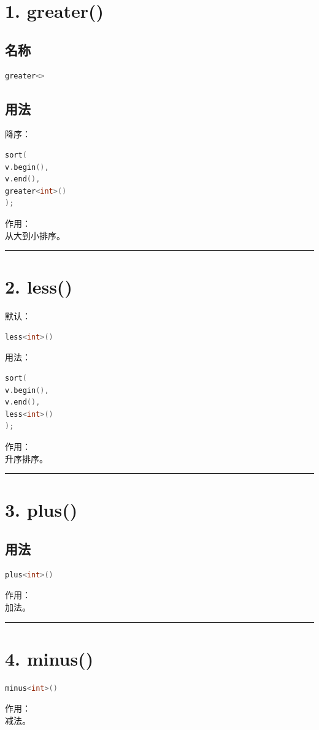 \documentclass[9pt,twocolumn]{extarticle}
\begin{document}
\section{1. greater()}

\subsection{名称}
\begin{lstlisting}[language=C++]
greater<>
\end{lstlisting}

\subsection{用法}
降序：
\begin{lstlisting}[language=C++]
sort(
v.begin(),
v.end(),
greater<int>()
);
\end{lstlisting}
作用：\\
从大到小排序。

\noindent\rule{\linewidth}{0.4pt}

\section{2. less()}

默认：
\begin{lstlisting}[language=C++]
less<int>()
\end{lstlisting}
用法：
\begin{lstlisting}[language=C++]
sort(
v.begin(),
v.end(),
less<int>()
);
\end{lstlisting}
作用：\\
升序排序。

\noindent\rule{\linewidth}{0.4pt}

\section{3. plus()}

\subsection{用法}
\begin{lstlisting}[language=C++]
plus<int>()
\end{lstlisting}
作用：\\
加法。

\noindent\rule{\linewidth}{0.4pt}

\section{4. minus()}
\begin{lstlisting}[language=C++]
minus<int>()
\end{lstlisting}
作用：\\
减法。
\end{document}
